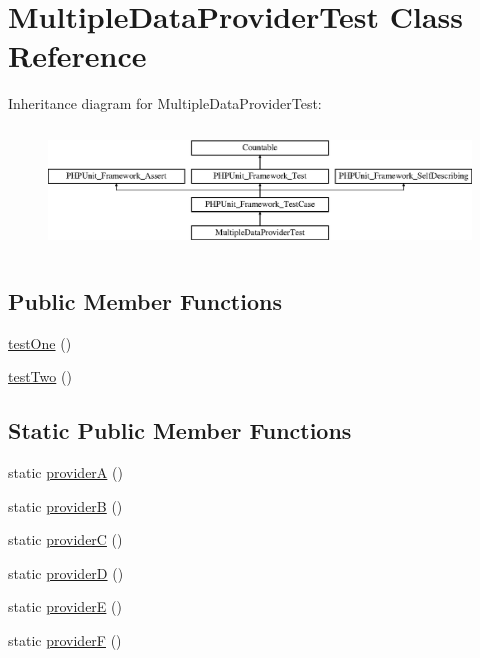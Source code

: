 \hypertarget{class_multiple_data_provider_test}{}\section{Multiple\+Data\+Provider\+Test Class Reference}
\label{class_multiple_data_provider_test}
Inheritance diagram for Multiple\+Data\+Provider\+Test\+:\begin{figure}[H]
\begin{center}
\leavevmode
\includegraphics[height=3.303835cm]{class_multiple_data_provider_test}
\end{center}
\end{figure}
\subsection*{Public Member Functions}
\begin{DoxyCompactItemize}
\item 
\mbox{\hyperlink{class_multiple_data_provider_test_afbf3ff88b322c6a7197ce02297cd23a0}{test\+One}} ()
\item 
\mbox{\hyperlink{class_multiple_data_provider_test_a4fb9974ce113d5d1db8075e0db0dc9b6}{test\+Two}} ()
\end{DoxyCompactItemize}
\subsection*{Static Public Member Functions}
\begin{DoxyCompactItemize}
\item 
static \mbox{\hyperlink{class_multiple_data_provider_test_acf90372df84faa0721266a8f29d0763f}{providerA}} ()
\item 
static \mbox{\hyperlink{class_multiple_data_provider_test_af6553246a4adae24be205eceb37a1ab9}{providerB}} ()
\item 
static \mbox{\hyperlink{class_multiple_data_provider_test_afd0c51172425506abcc035529124f30a}{providerC}} ()
\item 
static \mbox{\hyperlink{class_multiple_data_provider_test_a751e8d62b768eedab6fdb7c12fa8934c}{providerD}} ()
\item 
static \mbox{\hyperlink{class_multiple_data_provider_test_a9851eb4080aa38fd57d4a73c4c6b839b}{providerE}} ()
\item 
static \mbox{\hyperlink{class_multiple_data_provider_test_adad1b061be008f41a51eea9db94a0814}{providerF}} ()
\end{DoxyCompactItemize}
